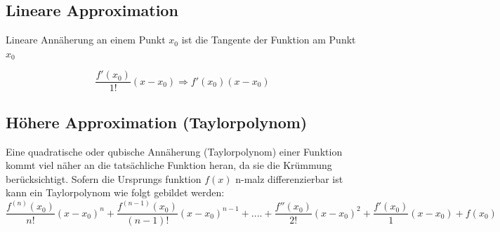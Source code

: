 \documentclass[12pt]{scrartcl}
\begin{document}
\subsection{Lineare Approximation}

Lineare Annäherung an einem Punkt $x_0$ ist die Tangente der 
Funktion am Punkt $x_0$

\[ \frac{f'( x_0 )}{1!} ( x - x_0) \Rightarrow f'( x_0 ) ( x - x_0) \] 


\subsection{Höhere Approximation (Taylorpolynom)}

Eine quadratische oder qubische Annäherung (Taylorpolynom) einer Funktion kommt viel näher an die tatsächliche Funktion heran, 
da sie die Krümmung berücksichtigt. Sofern die Ursprungs funktion $f(x)$ n-malz
differenzierbar ist kann ein Taylorpolynom wie folgt gebildet werden:
\[
    \frac{f^{(n)} ( x_0 )}{n!} ( x - x_0)^n +
    \frac{f^{(n-1)} ( x_0 )}{(n - 1)!} ( x - x_0)^{n - 1} + .... +
    \frac{f'' ( x_0 )}{2!} ( x - x_0)^2 + 
    \frac{f' ( x_0 )}{1} ( x - x_0)
    + f(x_0)
\]


\newcommand{\drawmisding}{
    \begin{tikzpicture}[line cap=round,line join=round,>=triangle 45,x=1cm,y=1cm]
        \clip(-2,-3) rectangle (2,3);
        \draw[line width=2pt,smooth,samples=200,domain=0.14:2.5] plot(\x,{ln((\x))});
        \begin{scriptsize}
            \draw[color=black] (0,-4) node {$f$};
        \end{scriptsize}
    \end{tikzpicture}
}
\end{document}
